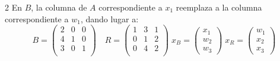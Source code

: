 \documentclass{article}
\begin{document}
\begin{multicols}{2}
        En $B$, la columna de $A$ correspondiente a $x_1$ reemplaza a la columna correspondiente a $w_1$, dando
        lugar a:
        \[
            B = \begin{pmatrix}
                    2 & 0 & 0 \\
                    4 & 1 & 0 \\
                    3 & 0 & 1 \\
            \end{pmatrix} \quad
            R = \begin{pmatrix}
                    1 & 3 & 1 \\
                    0 & 1 & 2 \\
                    0 & 4 & 2 \\
            \end{pmatrix} \;
            x_B = \begin{pmatrix}
                      x_1 \\
                      w_2 \\
                      w_3
            \end{pmatrix} \;
            x_R = \begin{pmatrix}
                      w_1 \\
                      x_2 \\
                      x_3
            \end{pmatrix}
        \]

    \end{multicols}
\end{document}
